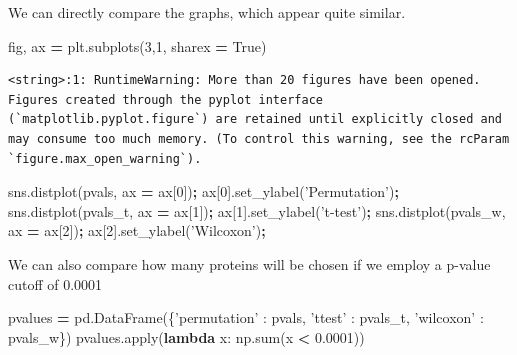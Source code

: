 \documentclass[
  letterpaper,
]{scrbook}
\newenvironment{Shaded}{\begin{snugshade}}{\end{snugshade}}
\newcommand{\BuiltInTok}[1]{#1}
\newcommand{\DecValTok}[1]{\textcolor[rgb]{0.00,0.00,0.81}{#1}}
\newcommand{\FloatTok}[1]{\textcolor[rgb]{0.00,0.00,0.81}{#1}}
\newcommand{\KeywordTok}[1]{\textcolor[rgb]{0.13,0.29,0.53}{\textbf{#1}}}
\newcommand{\NormalTok}[1]{#1}
\newcommand{\OperatorTok}[1]{\textcolor[rgb]{0.81,0.36,0.00}{\textbf{#1}}}
\newcommand{\StringTok}[1]{\textcolor[rgb]{0.31,0.60,0.02}{#1}}
\newcommand{\VariableTok}[1]{\textcolor[rgb]{0.00,0.00,0.00}{#1}}
\begin{document}
We can directly compare the graphs, which appear quite similar.

\begin{Shaded}
\begin{Highlighting}[]
\NormalTok{fig, ax }\OperatorTok{=}\NormalTok{ plt.subplots(}\DecValTok{3}\NormalTok{,}\DecValTok{1}\NormalTok{, sharex }\OperatorTok{=} \VariableTok{True}\NormalTok{)}
\end{Highlighting}
\end{Shaded}

\begin{verbatim}
<string>:1: RuntimeWarning: More than 20 figures have been opened. Figures created through the pyplot interface (`matplotlib.pyplot.figure`) are retained until explicitly closed and may consume too much memory. (To control this warning, see the rcParam `figure.max_open_warning`).
\end{verbatim}

\begin{Shaded}
\begin{Highlighting}[]
\NormalTok{sns.distplot(pvals, ax }\OperatorTok{=}\NormalTok{ ax[}\DecValTok{0}\NormalTok{])}\OperatorTok{;}\NormalTok{ ax[}\DecValTok{0}\NormalTok{].set_ylabel(}\StringTok{'Permutation'}\NormalTok{)}\OperatorTok{;}
\NormalTok{sns.distplot(pvals_t, ax }\OperatorTok{=}\NormalTok{ ax[}\DecValTok{1}\NormalTok{])}\OperatorTok{;}\NormalTok{ ax[}\DecValTok{1}\NormalTok{].set_ylabel(}\StringTok{'t-test'}\NormalTok{)}\OperatorTok{;}
\NormalTok{sns.distplot(pvals_w, ax }\OperatorTok{=}\NormalTok{ ax[}\DecValTok{2}\NormalTok{])}\OperatorTok{;}\NormalTok{ ax[}\DecValTok{2}\NormalTok{].set_ylabel(}\StringTok{'Wilcoxon'}\NormalTok{)}\OperatorTok{;}
\end{Highlighting}
\end{Shaded}

We can also compare how many proteins will be chosen if we employ a p-value cutoff of 0.0001

\begin{Shaded}
\begin{Highlighting}[]
\NormalTok{pvalues }\OperatorTok{=}\NormalTok{ pd.DataFrame(\{}\StringTok{'permutation'}\NormalTok{ : pvals, }\StringTok{'ttest'}\NormalTok{ : pvals_t,}
                           \StringTok{'wilcoxon'}\NormalTok{ : pvals_w\})}
\NormalTok{pvalues.}\BuiltInTok{apply}\NormalTok{(}\KeywordTok{lambda}\NormalTok{ x: np.}\BuiltInTok{sum}\NormalTok{(x }\OperatorTok{<} \FloatTok{0.0001}\NormalTok{))}
\end{Highlighting}
\end{Shaded}
\end{document}
